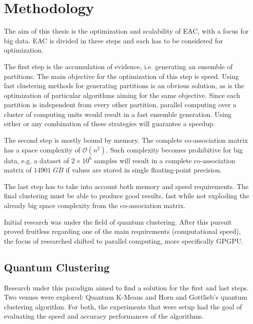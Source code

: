 \section{Methodology}


The aim of this thesis is the optimization and scalability of EAC, with a focus for big data. EAC is divided in three steps and each has to be considered for optimization.

The first step is the accumulation of evidence, i.e. generating an ensemble of partitions. The main objective for the optimization of this step is speed. Using fast clustering methods for generating partitions is an obvious solution, as is the optimization of particular algorithms aiming for the same objective. Since each partition is independent from every other partition, parallel computing over a cluster of computing units would result in a fast ensemble generation. Using either or any combination of these strategies will guarantee a speedup.


The second step is mostly bound by memory. The complete co-association matrix has a space complexity of $\mathcal{O}(n^2)$. Such complexity becomes prohibitive for big data, e.g. a dataset of $2\times10^6$ samples will result in a complete co-association matrix of $14901 \; GB$ if values are stored in single floating-point precision.

The last step has to take into account both memory and speed requirements. The final clustering must be able to produce good results, fast while not exploding the already big space complexity from the co-association matrix.

Initial research was under the field of quantum clustering. After this pursuit proved fruitless regarding one of the main requirements (computational speed), the focus of researched shifted to parallel computing, more specifically GPGPU.

\subsection{Quantum Clustering}

Research under this paradigm aimed to find a solution for the first and last steps. Two venues were explored: Quantum K-Means and Horn and Gottlieb's quantum clustering algorithm.
For both, the experiments that were setup had the goal of evaluating the speed and accuracy performances of the algorithms.

